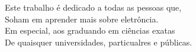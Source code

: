 Este trabalho é dedicado a todas as pessoas que,\\
Soham em aprender mais sobre eletrôncia.\\
Em especial, aos graduando em ciências exatas\\
De quaisquer universidades, particualres e públicas.
